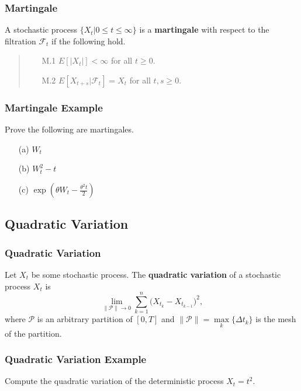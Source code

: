 \documentclass{beamer}
\begin{document}
\begin{frame}
\frametitle{Martingale} 

\begin{Definition}
A stochastic process $\{X_t | 0\leq t \leq\infty\}$ is a {\bf martingale} with respect to the filtration $\mathcal{F}_t$ if the following hold.
\medskip

\begin{quote}
\begin{enumerate}
\item[M.1] $E\left[|X_t|\right] <\infty$ for all $t\geq 0$.
\item[M.2] $E\left[ X_{t + s} | \mathcal{F}_t\right] = X_t$ for all $t, s \geq 0$.
\end{enumerate}
\end{quote}
\end{Definition}

\end{frame}

\begin{frame}[t]
\frametitle{Martingale Example} 
\begin{Example}
Prove the following are martingales.
\begin{itemize}
\item[(a)] $W_t$
\item[(b)] $W_t^2 - t$
\item[(c)] $\exp\left(\theta W_t - \frac{\theta^2 t}{2}\right)$
\end{itemize}
\end{Example}

\end{frame}

\subsection{Quadratic Variation}

\begin{frame}
\frametitle{Quadratic Variation}
\begin{Definition}
Let $X_t$ be some stochastic process. The {\bf quadratic variation} of a stochastic process $X_t$ is
$$
\lim_{\|\mathcal{P}\|\to 0} \sum_{k = 1}^n \Big(X_{t_k} - X_{t_{k - 1}}\Big)^2,
$$
where $\mathcal{P}$ is an arbitrary partition of $[0, T]$ and $\|\mathcal{P}\| = \max\limits_k\{\Delta t_k\}$ is the mesh of the partition.
\end{Definition}
\end{frame}

\begin{frame}[t]
\frametitle{Quadratic Variation Example}
\begin{Example}
Compute the quadratic variation of the deterministic process $X_t = t^2$.
\end{Example}

\end{frame}
\end{document}

